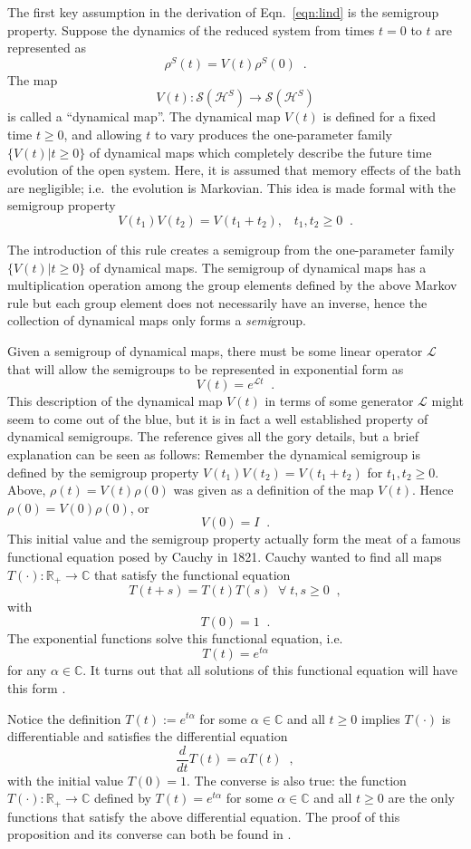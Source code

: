The first key assumption in the derivation of Eqn.\ \ref{eqn:lind} is the semigroup property.  Suppose the dynamics of the reduced system from times $t=0$ to $t$ are represented as
$$
\rho^S(t) = V(t)\rho^S(0)\;\;. 
$$
The map 
$$
V(t) : \mathcal{S}(\mathcal{H}^S) \rightarrow \mathcal{S}(\mathcal{H}^S)
$$
is called a ``dynamical map''.  The dynamical map $V(t)$ is defined for a fixed time $t\ge0$, and allowing $t$ to vary produces the one-parameter family $\{V(t)|t\ge0\}$ of dynamical maps which completely describe the future time evolution of the open system.  Here, it is assumed that memory effects of the bath are negligible; i.e.\ the evolution is Markovian.  This idea is made formal with the semigroup property
$$
V(t_1)V(t_2) = V(t_1+t_2),\;\;\;t_1,t_2\ge0\;\;.
$$

The introduction of this rule creates a semigroup from the one-parameter family $\{V(t)|t\ge0\}$ of dynamical maps.  The semigroup of dynamical maps has a multiplication operation among the group elements defined by the above Markov rule but each group element does not necessarily have an inverse, hence the collection of dynamical maps only forms a {\it semi}group.

Given a semigroup of dynamical maps, there must be some linear operator $\mathcal{L}$ that will allow the semigroups to be represented in exponential form as
$$
V(t) = e^{\mathcal{L}t}\;\;.
$$
This description of the dynamical map $V(t)$ in terms of some generator $\mathcal{L}$ might seem to come out of the blue, but it is in fact a well established property of dynamical semigroups.  The reference \cite{Engel1999} gives all the gory details, but a brief explanation can be seen as follows:  Remember the dynamical semigroup is defined by the semigroup property $V(t_1)V(t_2) = V(t_1+t_2)$ for $t_1,t_2\ge0$.  Above, $\rho(t) = V(t)\rho(0)$ was given as a definition of the map $V(t)$.  Hence $\rho(0)=V(0)\rho(0)$, or
$$
V(0) = I\;\;.
$$
This initial value and the semigroup property actually form the meat of a famous functional equation posed by Cauchy in 1821.  Cauchy wanted to find all maps $T(\cdot): \mathbb{R}_+\rightarrow \mathbb{C}$ that satisfy the functional equation
$$
T(t+s) = T(t)T(s)\;\;\forall\; t,s \ge 0\;\;,
$$
with
$$
T(0) = 1\;\;.
$$
The exponential functions solve this functional equation, i.e.
$$
T(t) = e^{t\alpha}
$$
for any $\alpha\in \mathbb{C}$.  It turns out that all solutions of this functional equation will have this form \cite{Engel1999}.  

Notice the definition $T(t) := e^{t\alpha}$ for some $\alpha \in \mathbb{C}$ and all $t\ge 0$ implies $T(\cdot)$ is differentiable and satisfies the differential equation
$$
\frac{ d }{dt} T(t) = \alpha T(t)\;\;,
$$
with the initial value $T(0) = 1$.  The converse is also true: the function $T(\cdot): \mathbb{R}_+\rightarrow \mathbb{C}$ defined by $T(t) = e^{t\alpha}$ for some $\alpha \in \mathbb{C}$ and all $t\ge 0$ are the only functions that satisfy the above differential equation.  The proof of this proposition and its converse can both be found in \cite{Engel1999}.  


